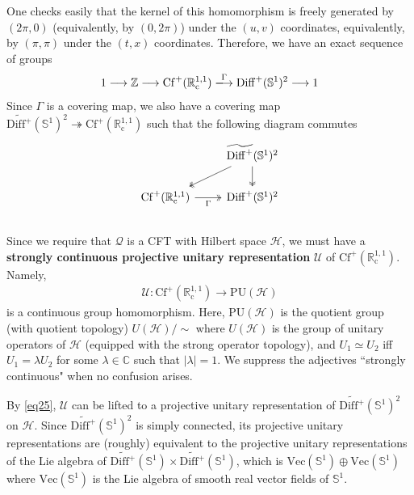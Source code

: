 \documentclass[12pt,b5paper,notitlepage]{article}
\theoremstyle{definition}
\theoremstyle{plain}
\newcommand{\mc}{\mathcal}
\newcommand{\Vect}{\mathrm{Vec}}
\newcommand{\Cbb}{\mathbb C}
\newcommand{\Zbb}{\mathbb Z}
\newcommand{\Sbb}{{\mathbb S}}
\newcommand{\Rc}{\mathbb R^{1,1}_{\mathrm{c}}}
\newcommand{\Cf}{\mathrm{Cf}}
\newcommand{\DiffS}{\mathrm{Diff}^+(\mathbb S^1)}
\newcommand{\WDS}{\widetilde{\mathrm{Diff}^+}(\mathbb S^1)}
\newcommand{\PU}{\mathrm{PU}}
\numberwithin{equation}{section}
\begin{document}
One checks easily that the kernel of this homomorphism is freely generated by $(2\pi,0)$ (equivalently, by $(0,2\pi)$) under the $(u,v)$ coordinates, equivalently, by $(\pi,\pi)$ under the $(t,x)$ coordinates. Therefore, we have an exact sequence of groups
\begin{align}
1\longrightarrow \Zbb\longrightarrow \Cf^+(\Rc)\xlongrightarrow{\Gamma}\DiffS^2\longrightarrow 1
\end{align}
Since $\Gamma$ is a covering map, we also have a covering map $\WDS^2\twoheadrightarrow \Cf^+(\Rc)$ such that the following diagram commutes
\begin{equation}\label{eq25}
\begin{tikzcd}
                       & \WDS^2 \arrow[d, two heads] \arrow[ld, two heads] \\
\Cf^+(\Rc) \arrow[r, two heads, "\Gamma"'] & \DiffS^2                                           
\end{tikzcd}
\end{equation}

\subsection{}



Since we require that $\mc Q$ is a CFT with Hilbert space $\mc H$, we must have a \textbf{strongly continuous projective unitary representation}  $\mc U$ of $\Cf^+(\Rc)$. Namely,
\begin{align*}
\mc U:\Cf^+(\Rc)\rightarrow \PU(\mc H)
\end{align*}
is a continuous group homomorphism. Here, $\PU(\mc H)$ is the quotient group (with quotient topology) $U(\mc H)/\sim$ where $U(\mc H)$ is the group of unitary operators of $\mc H$ (equipped with the strong operator topology), and $U_1\simeq U_2$ iff $U_1=\lambda U_2$ for some $\lambda\in\Cbb$ such that $|\lambda|=1$. We suppress the adjectives ``strongly continuous" when no confusion arises.


By \eqref{eq25}, $\mc U$ can be lifted to a projective unitary representation of $\WDS^2$ on $\mc H$. Since $\WDS^2$ is simply connected, its projective unitary representations are (roughly) equivalent to the projective unitary representations of the Lie algebra of $\WDS\times\WDS$, which is $\Vect(\Sbb^1)\oplus\Vect(\Sbb^1)$ where $\Vect(\Sbb^1)$ \index{Vec@$\Vect(\Sbb^1)$} is the Lie algebra of smooth real vector fields of $\Sbb^1$. 
\end{document}
